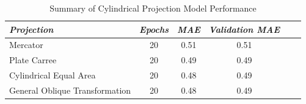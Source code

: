 \begin{table}[ht]
    \centering
    \caption{Summary of Cylindrical Projection Model Performance}
    \label{cylindrical_results_table}
    \renewcommand{\arraystretch}{1.2} %
    \begin{tabular}{|l|c|c|c|c|c|}
        \hline
        \rowcolor[gray]{0.9}
        \textbf{\emph{Projection}}     & \textbf{\emph{Epochs}} & \textbf{\emph{MAE}} & \textbf{\emph{Validation MAE}} \\ \hline
        Mercator                       & 20                     & 0.51                & 0.51                           \\ \hline
        Plate Carree                   & 20                     & 0.49                & 0.49                           \\ \hline
        Cylindrical Equal Area         & 20                     & 0.48                & 0.49                           \\ \hline
        General Oblique Transformation & 20                     & 0.48                & 0.49                           \\ \hline
    \end{tabular}


\end{table}